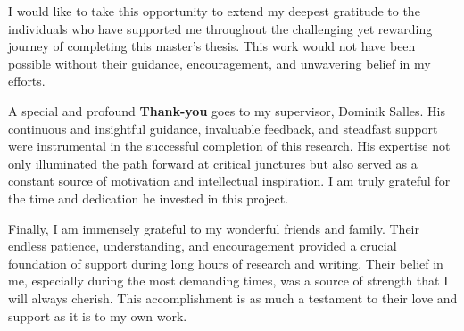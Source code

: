 I would like to take this opportunity to extend my deepest gratitude to the individuals who have supported me throughout the challenging yet rewarding journey of completing this master's thesis. This work would not have been possible without their guidance, encouragement, and unwavering belief in my efforts.

\vspace{1em}

A special and profound \textbf{Thank-you} goes to my supervisor, Dominik Salles. His continuous and insightful guidance, invaluable feedback, and steadfast support were instrumental in the successful completion of this research. His expertise not only illuminated the path forward at critical junctures but also served as a constant source of motivation and intellectual inspiration. I am truly grateful for the time and dedication he invested in this project.

\vspace{1em}

Finally, I am immensely grateful to my wonderful friends and family. Their endless patience, understanding, and encouragement provided a crucial foundation of support during long hours of research and writing. Their belief in me, especially during the most demanding times, was a source of strength that I will always cherish. This accomplishment is as much a testament to their love and support as it is to my own work.